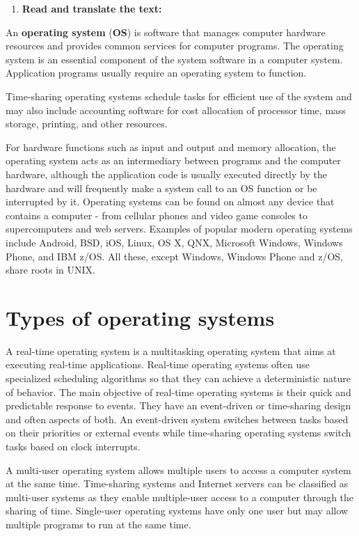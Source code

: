 \documentclass{full}
\begin{document}
\begin{enumerate}[label=\textbf{\Roman*.},leftmargin=5ex,start=\gettask]
  \nexttask
  \item \textbf{Read and translate the text:}
\end{enumerate}

An \textbf{operating system} (\textbf{OS}) is software that manages computer
hardware resources and provides common services for computer programs. The
operating system is an essential component of the system software in a computer
system. Application programs usually require an operating system to function.

Time-sharing operating systems schedule tasks for efficient use of the system
and may also include accounting software for cost allocation of processor time,
mass storage, printing, and other resources.

For hardware functions such as input and output and memory allocation, the
operating system acts as an intermediary between programs and the computer
hardware, although the application code is usually executed directly by the
hardware and will frequently make a system call to an OS function or be
interrupted by it. Operating systems can be found on almost any device that
contains a computer - from cellular phones and video game consoles to
supercomputers and web servers. Examples of popular modern operating systems
include Android, BSD, iOS, Linux, OS X, QNX, Microsoft Windows, Windows Phone,
and IBM z/OS. All these, except Windows, Windows Phone and z/OS, share roots in
UNIX.

\section*{Types of operating systems}
A real-time operating system is a multitasking operating system that aims at
executing real-time applications. Real-time operating systems often use
specialized scheduling algorithms so that they can achieve a deterministic
nature of behavior. The main objective of real-time operating systems is their
quick and predictable response to events. They have an event-driven or
time-sharing design and often aspects of both. An event-driven system switches
between tasks based on their priorities or external events while time-sharing
operating systems switch tasks based on clock interrupts.

A multi-user operating system allows multiple users to access a computer system
at the same time. Time-sharing systems and Internet servers can be classified as
multi-user systems as they enable multiple-user access to a computer through the
sharing of time. Single-user operating systems have only one user but may allow
multiple programs to run at the same time.
\end{document}
